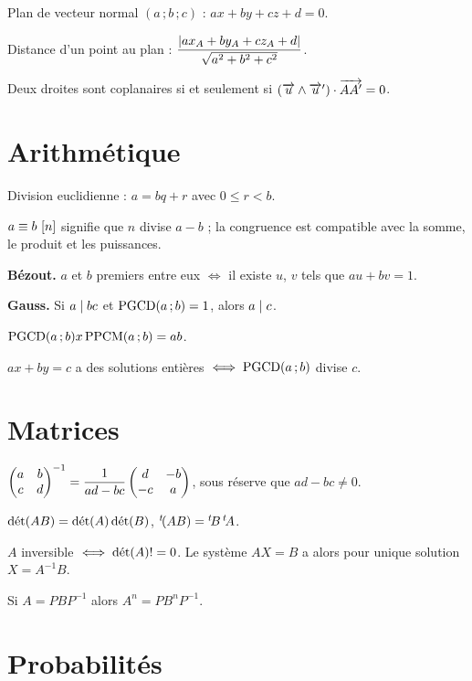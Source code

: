 \smallskip
\noindent
Plan de vecteur normal $(a\,;b\,;c)$ : $ax+by+cz+d = 0$.

\smallskip
\noindent
Distance d'un point au plan :
$\dfrac{\left|ax_{A}+by_{A}+cz_{A}+d\right|}{\sqrt{a^{2}+b^{2}+c^{2}}}$.

\smallskip
\noindent
Deux droites sont coplanaires si et seulement si
$\left(\overrightarrow{u} \wedge \overrightarrow{u}'\right) \cdot \overrightarrow{AA'} = 0$.

\section*{Arithmétique}

\noindent
Division euclidienne : $a = bq+r$ avec $0 \leq r<b$.

\smallskip
\noindent
$a \equiv b \ [n]$ signifie que $n$ divise $a-b$ ; la congruence est
compatible avec la somme, le produit et les puissances.

\smallskip
\noindent
\textbf{Bézout.} $a$ et $b$ premiers entre eux $\iff$ il existe $u$, $v$ tels
que $au+bv = 1$.

\smallskip
\noindent
\textbf{Gauss.} Si $a \mid bc$ et $\operatorname{PGCD}(a\,;b) = 1$, alors $a \mid c$.

\smallskip
\noindent
$\operatorname{PGCD}(a\,;b) x \operatorname{PPCM}(a\,;b) = ab$.

\smallskip
\noindent
$ax+by = c$ a des solutions entières $\iff \operatorname{PGCD}(a\,;b)$ divise $c$.

\section*{Matrices}

\noindent
$\begin{pmatrix} a & b \\ c & d \end{pmatrix}^{-1} = \dfrac{1}{ad-bc}\begin{pmatrix} d & -b \\ -c & a \end{pmatrix}$, sous
réserve que $ad-bc \neq 0$.

\smallskip
\noindent
$\operatorname{d\acute{e}t}(AB) = \operatorname{d\acute{e}t}(A)\operatorname{d\acute{e}t}(B)$, \quad
${}^{t}\!(AB) = {}^{t}\!B\,{}^{t}\!A$.

\smallskip
\noindent
$A$ inversible $\iff \operatorname{d\acute{e}t}(A) != 0$. Le système $AX = B$ a alors pour
unique solution $X = A^{-1}B$.

\smallskip
\noindent
Si $A = PBP^{-1}$ alors $A^{n} = PB^{n}P^{-1}$.

\section*{Probabilités}

